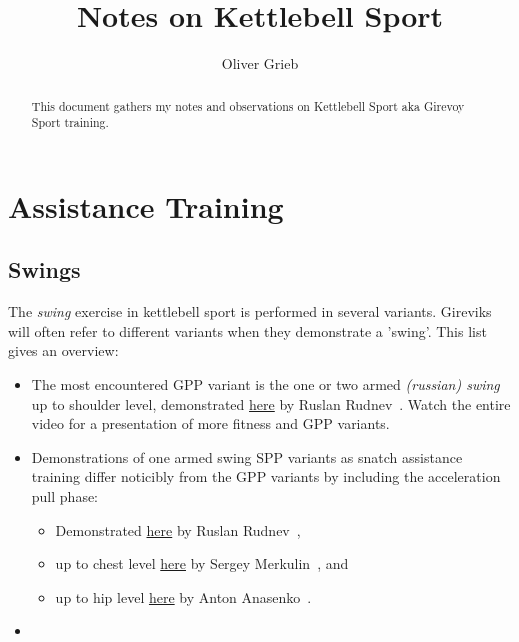 \documentclass[a4paper,11pt,oneside]{article}
\author{Oliver Grieb}
\title{Notes on Kettlebell Sport}
\begin{document}
\maketitle

\begin{abstract}
This document gathers my notes and observations on Kettlebell Sport aka Girevoy 
Sport training.
\end{abstract}


\section{Assistance Training}


\subsection{Swings}

The \emph{swing} exercise in kettlebell sport is performed in several variants. 
Gireviks will often refer to different variants when they demonstrate a 'swing'.
This list gives an overview:

\begin{itemize}
  \item The most encountered GPP variant is the one or two armed \emph{(russian) swing}
  up to shoulder level, demonstrated \href{https://youtu.be/T2Sx7qi1TcQ?t=167}{here} 
  by Ruslan Rudnev~\cite{rkbyten_swings}. Watch the entire video for a presentation 
  of more fitness and GPP variants.
  
  \item Demonstrations of one armed swing SPP variants as snatch assistance training
  differ noticibly from the GPP variants by including the acceleration pull phase:
    \begin{itemize}
      \item Demonstrated  
      \href{https://youtu.be/T2Sx7qi1TcQ?t=167}{here} by Ruslan 
      Rudnev~\cite{rkbyten_swings},

      \item up to chest level \href{https://youtu.be/J3Vict1FzZI}{here} by 
      Sergey Merkulin~\cite{merkulin_swings}, and

      \item up to hip level \href{https://youtu.be/kOKHlc8EK8o}{here} by 
      Anton Anasenko~\cite{anasenko_swings}.
    \end{itemize}
  
  \item 
\end{itemize}
\end{document}
